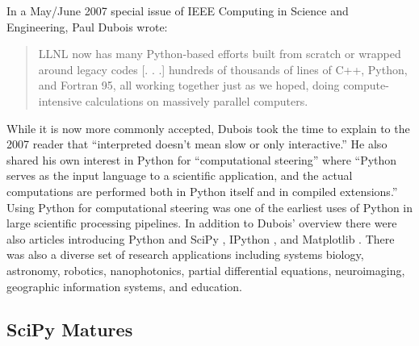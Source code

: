\documentclass[fleqn,10pt]{wlscirep}
\begin{document}

In a May/June 2007 special issue of IEEE Computing in Science and
Engineering, Paul Dubois wrote\cite{dubois2007guest}:
\begin{quote}
LLNL now has many Python-based efforts built from scratch or wrapped around
legacy codes [. . .] hundreds of thousands
of lines of C++, Python, and Fortran 95, all working together just as we hoped,
doing compute-intensive calculations on massively parallel computers.
\end{quote}
While it is now more commonly accepted, Dubois took the time to explain to
the 2007 reader that ``interpreted doesn't mean slow or only interactive.''
He also shared his own interest in Python for ``computational steering''
where ``Python serves as the input language to a scientific application, and the actual
computations are performed both in Python itself and in compiled extensions.''
Using Python for computational steering was one of the earliest uses of Python
in large scientific processing pipelines.
In addition to Dubois' overview there were also articles introducing
Python and SciPy \cite{oliphant2007python}, IPython \cite{perez2007ipython},
and  Matplotlib \cite{hunter2007matplotlib}.
There was also a diverse set of
research applications including
systems biology\cite{myers2007python},
astronomy\cite{greenfield2007reaching},
robotics\cite{krauss2007python},
nanophotonics\cite{bienstman2007python},
partial differential equations\cite{mardal2007using},
neuroimaging\cite{millman2007analysis},
geographic information systems\cite{shi2007python}, and
education\cite{backer2007computational, myers2007pythona}.


\subsection*{SciPy Matures}
\end{document}
